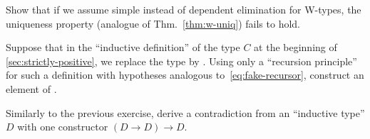 \begin{ex}
  Show that if we assume simple instead of dependent elimination for W-types, the uniqueness property (analogue of Thm.~\ref{thm:w-uniq}) fails to hold.
\end{ex}

\begin{ex}\label{ex:loop}
  Suppose that in the ``inductive definition'' of the type $C$ at the beginning of \autoref{sec:strictly-positive}, we replace the type \nat by \emptyt.
  Using only a ``recursion principle'' for such a definition with hypotheses analogous to~\eqref{eq:fake-recursor}, construct an element of \emptyt.
\end{ex}

\begin{ex}\label{ex:loop2}
  Similarly to the previous exercise, derive a contradiction from an ``inductive type'' $D$ with one constructor $(D\to D) \to D$.
\end{ex}


